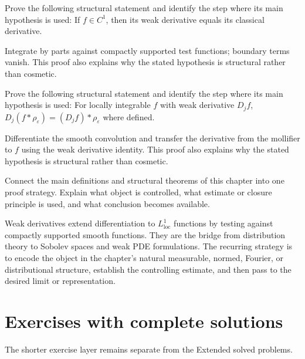 \begin{problem}\label{prob:iii20-problem-10}
Prove the following structural statement and identify the step where its main hypothesis is used: If $f\in C^1$, then its weak derivative equals its classical derivative.
\end{problem}
\begin{solution}
Integrate by parts against compactly supported test functions; boundary terms vanish. This proof also explains why the stated hypothesis is structural rather than cosmetic.
\end{solution}

\begin{problem}\label{prob:iii20-problem-11}
Prove the following structural statement and identify the step where its main hypothesis is used: For locally integrable $f$ with weak derivative $D_jf$, $D_j(f*\rho_\varepsilon)=(D_jf)*\rho_\varepsilon$ where defined.
\end{problem}
\begin{solution}
Differentiate the smooth convolution and transfer the derivative from the mollifier to $f$ using the weak derivative identity. This proof also explains why the stated hypothesis is structural rather than cosmetic.
\end{solution}

\begin{problem}\label{prob:iii20-problem-12}
Connect the main definitions and structural theorems of this chapter into one proof strategy. Explain what object is controlled, what estimate or closure principle is used, and what conclusion becomes available.
\end{problem}
\begin{solution}
Weak derivatives extend differentiation to $L^1_{\mathrm{loc}}$ functions by testing against compactly supported smooth functions. They are the bridge from distribution theory to Sobolev spaces and weak PDE formulations. The recurring strategy is to encode the object in the chapter's natural measurable, normed, Fourier, or distributional structure, establish the controlling estimate, and then pass to the desired limit or representation.
\end{solution}
\section{Exercises with complete solutions}
The shorter exercise layer remains separate from the Extended solved problems.

